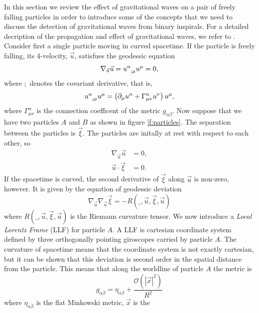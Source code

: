In this section we review the effect of gravitational waves on a pair of
freely falling particles in order to introduce some of the concepts that we
need to discuss the detection of gravitational waves from binary inspirals.
For a detailed decription of the propagation and effect of gravitational
waves, we refer to \cite{MTW73,Thorne:1982cv}. Consider first a single
particle moving in curved spacetime. If the particle is freely falling, its
4-velocity, $\vec{u}$, satisfues the geodessic equation
\begin{equation}
\label{eq:geodessic}
\nabla_{\vec{u}} \vec{u} = \tensor{u}{^\alpha_{;\mu}}u^{\mu} = 0,
\end{equation}
where $;$ denotes the covariant derivative, that is,
\begin{equation}
\tensor{u}{^\alpha_{;\mu}}\tensor{u}{^{\mu}} = \left(\partial_\mu\tensor{u}{^\alpha} +
\Gamma^\alpha_{\mu\nu}u^\nu\right) u^\mu,
\end{equation}
where $\Gamma^\alpha_{\mu\nu}$ is the connection coefficent of the metric
$g_{\alpha\beta}$. Now suppose that we have two particles $A$ and $B$ as shown
in figure \ref{f:particles}. The separation between the particles is
$\vec{\xi}$. The particles are initally at rest with respect to each other, so
\begin{align}
\nabla_{\vec{u}} \vec{u} &= 0, \\
\vec{u} \cdot \vec{\xi} & = 0.
\end{align}
If the spacetime is curved, the second derivative of $\vec{\xi}$ along
$\vec{u}$ is non-zero, however. It is given by the equation of geodessic
deviation
\begin{equation}
\nabla_{\vec{u}}\nabla_{\vec{u}} \vec{\xi} = - R(\_,\vec{u},\vec{\xi},\vec{u})
\end{equation}
where $R(\_,\vec{u},\vec{\xi},\vec{u})$ is the Riemann curvature tensor. We now
introduce a \emph{Local Lorentz Frame} (LLF) for particle $A$. A LLF is
cartesian coordinate system defined by three orthogonally pointing giroscopes
carried by particle $A$. The curvature of spacetime means that the coordinate
system is not exactly cartesian, but it can be shown that this deviation is
second order in the spatial distance from the particle\cite{MTW73}. This means
that along the worldline of particle $A$ the metric is
\begin{equation}
g_{\alpha\beta} = \eta_{\alpha\beta} + \frac{\mathcal{O}\left(|\vec{x}|^2\right)}{R^2}
\end{equation}
where $\eta_{\alpha\beta}$ is the flat Minkowski metric, $\vec{x}$ is the
